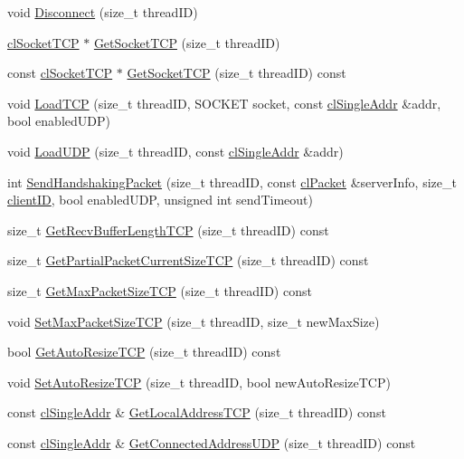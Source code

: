 \begin{DoxyCompactItemize}
void \hyperlink{classcl_s_client_ab9c1ea6a2196562e99b191a97dab058b}{Disconnect} (size\_\-t threadID)
\item 
\hyperlink{classcl_socket_t_c_p}{clSocketTCP} $\ast$ \hyperlink{classcl_s_client_aa1c7fadc44fd30f44cc5d45af30b7b1e}{GetSocketTCP} (size\_\-t threadID)
\item 
const \hyperlink{classcl_socket_t_c_p}{clSocketTCP} $\ast$ \hyperlink{classcl_s_client_aad37f5b898ae869be612d90305186005}{GetSocketTCP} (size\_\-t threadID) const 
\item 
void \hyperlink{classcl_s_client_a8757aa526a1ea94a1bc64deb7971cede}{LoadTCP} (size\_\-t threadID, SOCKET socket, const \hyperlink{classcl_single_addr}{clSingleAddr} \&addr, bool enabledUDP)
\item 
void \hyperlink{classcl_s_client_ad4c7e64bbfd7bad34a52311d0d00609a}{LoadUDP} (size\_\-t threadID, const \hyperlink{classcl_single_addr}{clSingleAddr} \&addr)
\item 
int \hyperlink{classcl_s_client_af9978a7ddb66b6c041e2606a59e5c69d}{SendHandshakingPacket} (size\_\-t threadID, const \hyperlink{classcl_packet}{clPacket} \&serverInfo, size\_\-t \hyperlink{classcl_s_client_ac5af0964e2af13aab950694923308512}{clientID}, bool enabledUDP, unsigned int sendTimeout)
\item 
size\_\-t \hyperlink{classcl_s_client_ad23a31beb4ec135a3f39da184999c696}{GetRecvBufferLengthTCP} (size\_\-t threadID) const 
\item 
size\_\-t \hyperlink{classcl_s_client_ab1de13b5c187540bae0e4af91db2685d}{GetPartialPacketCurrentSizeTCP} (size\_\-t threadID) const 
\item 
size\_\-t \hyperlink{classcl_s_client_a5cccbe5583ed198f97826a1c5108bb4a}{GetMaxPacketSizeTCP} (size\_\-t threadID) const 
\item 
void \hyperlink{classcl_s_client_a88018b22e270d1e89feefe05c23af49e}{SetMaxPacketSizeTCP} (size\_\-t threadID, size\_\-t newMaxSize)
\item 
bool \hyperlink{classcl_s_client_a586f33ed29909d3e2c0b6454e725b1eb}{GetAutoResizeTCP} (size\_\-t threadID) const 
\item 
void \hyperlink{classcl_s_client_afc6bdb1157707ea2cf21970602b86c5c}{SetAutoResizeTCP} (size\_\-t threadID, bool newAutoResizeTCP)
\item 
const \hyperlink{classcl_single_addr}{clSingleAddr} \& \hyperlink{classcl_s_client_a08ea258df61181a350a828aa1e3a9175}{GetLocalAddressTCP} (size\_\-t threadID) const 
\item 
const \hyperlink{classcl_single_addr}{clSingleAddr} \& \hyperlink{classcl_s_client_a74cd5fc9af94414af26cb79a15a25d49}{GetConnectedAddressUDP} (size\_\-t threadID) const 

\end{DoxyCompactItemize}
